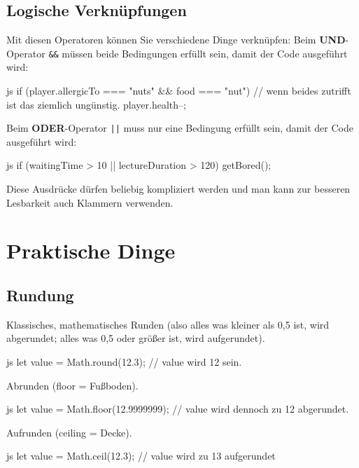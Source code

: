 \documentclass[10pt,a4paper]{article}
\begin{document}
\begin{multicols}{3}
\subsection*{Logische Verknüpfungen}
Mit diesen Operatoren können Sie verschiedene Dinge verknüpfen:
Beim \textbf{UND}-Operator \texttt{\&\&} müssen beide Bedingungen erfüllt sein, damit der Code ausgeführt wird:
\begin{codebox}{js}{}
  if (player.allergicTo === "nuts" && food === "nut") {
    // wenn beides zutrifft ist das ziemlich ungünstig.
    player.health--;
  }
\end{codebox}
Beim \textbf{ODER}-Operator \texttt{||} muss nur eine Bedingung erfüllt sein, damit der Code ausgeführt wird:
\begin{codebox}{js}{}
  if (waitingTime > 10 || lectureDuration > 120) {
    getBored();
  }
\end{codebox}
Diese Ausdrücke dürfen beliebig kompliziert werden und man kann zur besseren Lesbarkeit auch Klammern verwenden.

\section*{Praktische Dinge}
\subsection*{Rundung}
Klassisches, mathematisches Runden (also alles was kleiner als 0,5 ist, wird abgerundet; alles was 0,5 oder größer ist, wird aufgerundet).
\begin{codebox}{js}{}
  let value = Math.round(12.3); // value wird 12 sein.
\end{codebox}
Abrunden (floor = Fußboden).
\begin{codebox}{js}{}
  let value = Math.floor(12.9999999); // value wird dennoch zu 12 abgerundet.
\end{codebox}
Aufrunden (ceiling = Decke).
\begin{codebox}{js}{}
  let value = Math.ceil(12.3); // value wird zu 13 aufgerundet
\end{codebox}




\printbibliography
{}
\end{multicols}
\end{document}
